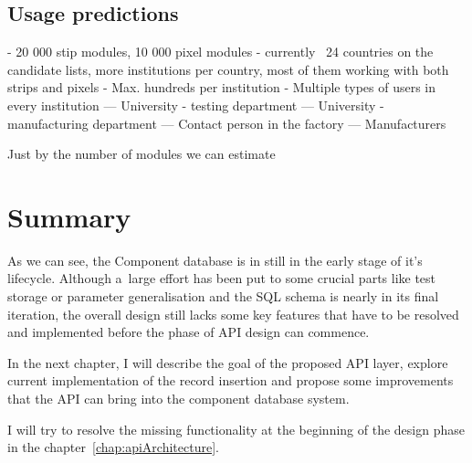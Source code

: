 \subsection{Usage predictions}
- 20 000 stip modules, 10 000 pixel modules
- currently ~24 countries on the candidate lists, more institutions per country, most of them working with both strips and pixels
- Max. hundreds per institution
- Multiple types of users in every institution
— University - testing department
— University - manufacturing department
— Contact person in the factory
— Manufacturers

Just by the number of modules we can estimate

\section{Summary}
\par As we can see, the Component database is in still in the early stage of it's lifecycle. Although a~large effort has been put to some crucial parts like test storage or parameter generalisation and the SQL schema is nearly in its final iteration,  the overall design still lacks some key features that have to be resolved and implemented before the phase of API design can commence.

\par In the next chapter, I will describe the goal of the proposed API layer, explore current implementation of the record insertion and propose some improvements that the API can bring into the component database system. 

\par I will try to resolve the missing functionality at the beginning of the design phase in the chapter~\ref{chap:apiArchitecture}.

